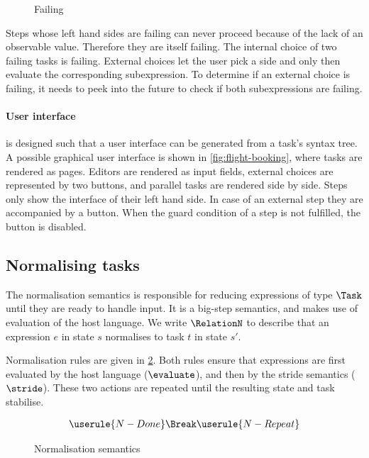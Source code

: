 \begin{figure}[h]
  \small
  \caption{Failing} \label{fig:observation-failing}
\end{figure}

Steps whose left hand sides are failing can never proceed because of the lack of an observable value.
Therefore they are itself failing.
The internal choice of two failing tasks is failing.
External choices let the user pick a side and only then evaluate the corresponding subexpression.
To determine if an external choice is failing, it needs to peek into the future to check if both subexpressions are failing.



\paragraph{User interface}

\TOPHAT is designed such that a user interface can be generated from a task's syntax tree.
A possible graphical user interface is shown in \cref{fig:flight-booking}, where tasks are rendered as \HTML pages.
Editors are rendered as input fields,
external choices are represented by two buttons,
and parallel tasks are rendered side by side.
Steps only show the interface of their left hand side.
In case of an external step they are accompanied by a button.
When the guard condition of a step is not fulfilled, the button is disabled.



\subsection{Normalising tasks}
\label{sec:normalise}

The normalisation semantics is responsible for reducing expressions of type $\Task$ until they are ready to handle input.
It is a big-step semantics, and makes use of evaluation of the host language.
We write $\RelationN$ to describe that
an expression $e$ in state $s$ normalises to task $t$ in state $s'$.

Normalisation rules are given in \cref{fig:normalisation-semantics}.
Both rules ensure that expressions are first evaluated by the host language ($\evaluate$), and then by the stride semantics ($\stride$).
These two actions are repeated until the resulting state and task stabilise.

\begin{figure}[h]
  \small

  \boxed{\RelationN}
  \begin{gather*}
    \userule{N-Done} \Break
    \userule{N-Repeat}
  \end{gather*}
  \caption{Normalisation semantics} \label{fig:normalisation-semantics}

\end{figure}

